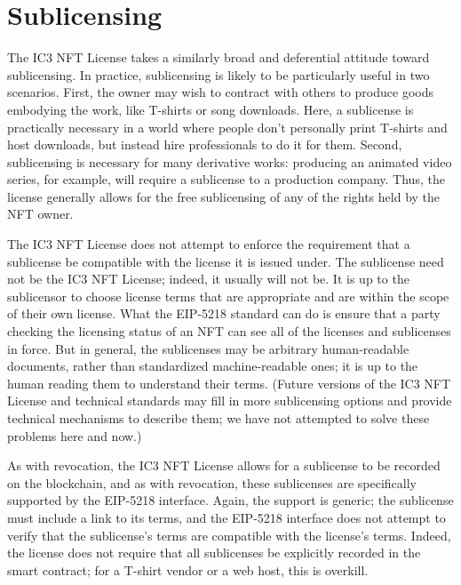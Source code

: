 \documentclass{article}
\newcommand{\eiplicense}{EIP-5218\xspace}
\newcommand{\iccclicense}{IC3 NFT License\xspace}
\begin{document}
\section{Sublicensing}

The \iccclicense takes a similarly broad and deferential attitude toward sublicensing. In practice, sublicensing is likely to be particularly useful in two scenarios. First, the owner may wish to contract with others to produce goods embodying the work, like T-shirts or song downloads. Here, a sublicense is practically necessary in a world where people don't personally print T-shirts and host downloads, but instead hire professionals to do it for them. Second, sublicensing is necessary for many derivative works: producing an animated video series, for example, will require a sublicense to a production company. Thus, the license generally allows for the free sublicensing of any of the rights held by the NFT owner.

The \iccclicense does not attempt to enforce the requirement that a sublicense be compatible with the license it is issued under. The sublicense need not be the \iccclicense; indeed, it usually will not be. It is up to the sublicensor to choose license terms that are appropriate and are within the scope of their own license. What the \eiplicense standard can do is ensure that a party checking the licensing status of an NFT can see all of the licenses and sublicenses in force. But in general, the sublicenses may be arbitrary human-readable documents, rather than standardized machine-readable ones; it is up to the human reading them to understand their terms. (Future versions of the \iccclicense and technical standards may fill in more sublicensing options and provide technical mechanisms to describe them; we have not attempted to solve these problems here and now.)

As with revocation, the \iccclicense allows for a sublicense to be recorded on the blockchain, and as with revocation, these sublicenses are specifically supported by the \eiplicense interface. Again, the support is generic; the sublicense must include a link to its terms, and the \eiplicense interface does not attempt to verify that the sublicense's terms are compatible with the license's terms. Indeed, the license does not require that all sublicenses be explicitly recorded in the smart contract; for a T-shirt vendor or a web host, this is overkill. 
\end{document}
